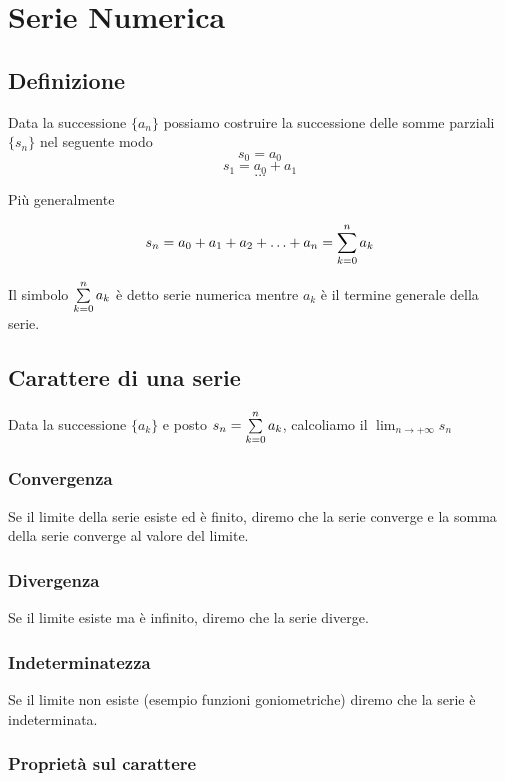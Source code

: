 \chapter{Serie Numerica}

\section{Definizione}

Data la successione $\{a_{n}\}$ possiamo costruire la successione delle somme parziali $\{s_{n}\}$ nel seguente modo $$s_0 = a_0$$ $$s_1 = a_0 + a_1$$ $$\ldots$$ 

Più generalmente 

$$s_n = a_0 + a_1 + a_2 + \ldots +  a_n = \sum\limits_{k=0}^{n}a_k$$

Il simbolo $\sum\limits_{k=0}^{n}a_k$ è detto serie numerica mentre $a_k$ è il termine generale della serie.

\section{Carattere di una serie}

Data la successione $\{a_{k}\}$ e posto $s_n = \sum\limits_{k=0}^{n}a_k$, calcoliamo il $\lim_{n \to +\infty} s_n$

\subsection{Convergenza }

Se il limite della serie esiste ed è finito, diremo che la serie converge e la somma della serie converge al valore del limite.

\subsection{Divergenza}

Se il limite esiste ma è infinito, diremo che la serie diverge.

\subsection{Indeterminatezza}

Se il limite non esiste (esempio funzioni goniometriche) diremo che la serie è indeterminata. 

\subsection{Proprietà sul carattere}


